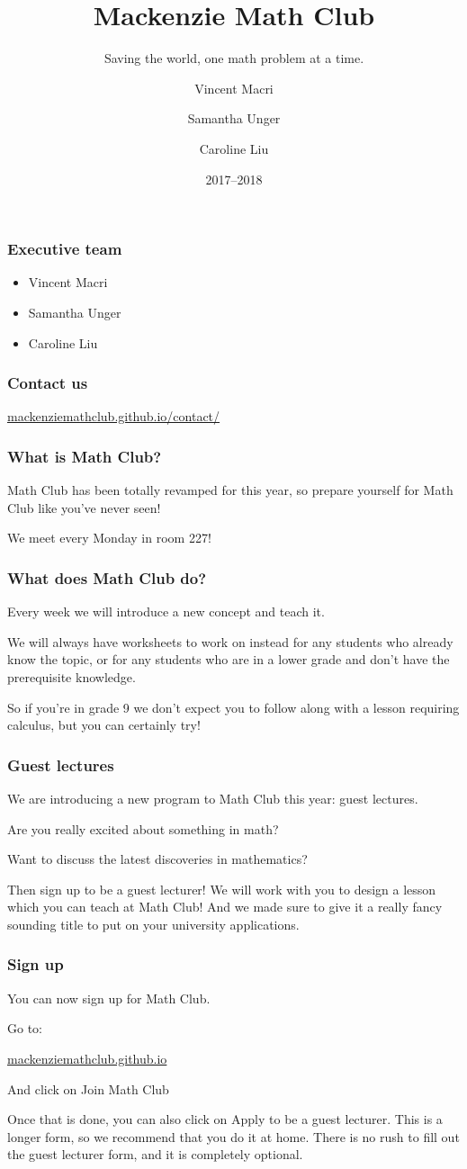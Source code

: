 \documentclass[mathserif]{beamer}
\title{Mackenzie Math Club}
\subtitle{Saving the world, one math problem at a time.}
\author{Vincent Macri \and Samantha Unger \and Caroline Liu}
\date{2017--2018}
\begin{document}
	\frame{\titlepage}
	\begin{frame}
		\frametitle{Executive team}
		\begin{itemize}
			\item Vincent Macri
			\item Samantha Unger
			\item Caroline Liu
		\end{itemize}
	\end{frame}
	\begin{frame}
		\frametitle{Contact us}
		\begin{center}
			\Large
			\url{mackenziemathclub.github.io/contact/}
		\end{center}
	\end{frame}
	\begin{frame}
		\frametitle{What is Math Club?}
		Math Club has been totally revamped for this year, so prepare yourself for Math Club like you've never seen!

		We meet every Monday in room 227!
	\end{frame}
	\begin{frame}
		\frametitle{What does Math Club do?}
		Every week we will introduce a new concept and teach it.
		\pause
		
		We will always have worksheets to work on instead for any students who already know the topic, or for any students who are in a lower grade and don't have the prerequisite knowledge.
		\pause

		So if you're in grade 9 we don't expect you to follow along with a lesson requiring calculus, but you can certainly try!
	\end{frame}
	\begin{frame}
		\frametitle{Guest lectures}
		We are introducing a new program to Math Club this year: guest lectures.
		\pause

		Are you really excited about something in math?
		\pause

		Want to discuss the latest discoveries in mathematics?
		\pause

		Then sign up to be a guest lecturer! We will work with you to design a lesson which you can teach at Math Club! And we made sure to give it a really fancy sounding title to put on your university applications.
	\end{frame}
	\begin{frame}
		\frametitle{Sign up}
		You can now sign up for Math Club.

		Go to:
		\begin{center}
			\huge
			\url{mackenziemathclub.github.io}
		\end{center}
		And click on \alert{Join Math Club}
		\pause

		Once that is done, you can also click on \alert{Apply to be a guest lecturer}. This is a longer form, so we recommend that you do it at home. There is no rush to fill out the guest lecturer form, and it is completely optional.
	\end{frame}
\end{document}
